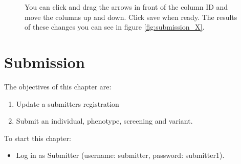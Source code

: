 \begin{figure}[ht]
  \begin{shaded}
	  \caption{You can click and drag the arrows in front of the column ID and move the columns up and down.
	  Click save when ready.
	  The results of these changes you can see in figure \ref{fig:submission_X}.}
		\label{fig:edit_column_XI}
  \end{shaded}
\end{figure}










\chapter{Submission}
The objectives of this chapter are:
\begin{enumerate}
	\item 
	Update a submitters registration
	\item 
	Submit an individual, phenotype, screening and variant.
\end{enumerate}
To start this chapter:
\begin{itemize}
	\item
	Log in as Submitter (username: submitter, password: submitter1).
\end{itemize}

